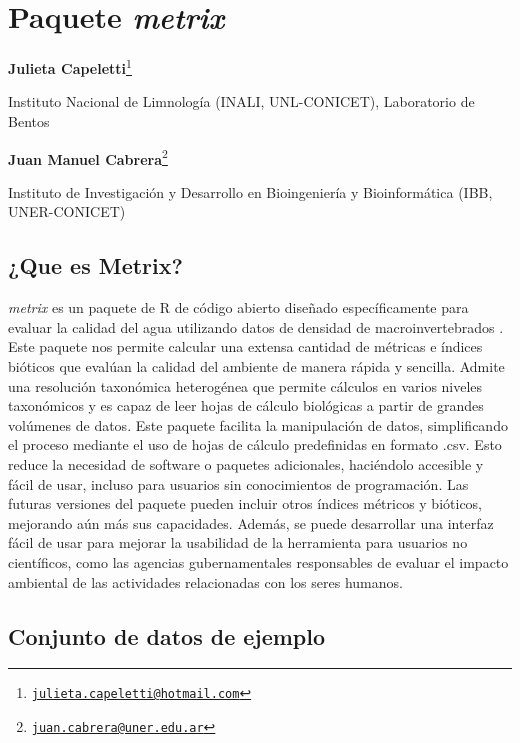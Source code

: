 \documentclass[
]{book}
\begin{document}
\hypertarget{metrix}{%
\chapter{\texorpdfstring{Paquete \emph{metrix}}{Paquete metrix}}\label{metrix}}

\textbf{Julieta Capeletti}\footnote{\href{mailto:julieta.capeletti@hotmail.com}{\nolinkurl{julieta.capeletti@hotmail.com}}}

Instituto Nacional de Limnología (INALI, UNL-CONICET), Laboratorio de Bentos

\textbf{Juan Manuel Cabrera}\footnote{\href{mailto:juan.cabrera@uner.edu.ar}{\nolinkurl{juan.cabrera@uner.edu.ar}}}

Instituto de Investigación y Desarrollo en Bioingeniería y Bioinformática (IBB, UNER-CONICET)

\hypertarget{que-es-metrix}{%
\section{¿Que es Metrix?}\label{que-es-metrix}}

\emph{metrix} es un paquete de R de código abierto diseñado específicamente para evaluar la calidad del agua utilizando datos de densidad de macroinvertebrados \citep{cabrera2023}.
Este paquete nos permite calcular una extensa cantidad de métricas e índices bióticos que evalúan la calidad del ambiente de manera rápida y sencilla.
Admite una resolución taxonómica heterogénea que permite cálculos en varios niveles taxonómicos y es capaz de leer hojas de cálculo biológicas a partir de grandes volúmenes de datos.
Este paquete facilita la manipulación de datos, simplificando el proceso mediante el uso de hojas de cálculo predefinidas en formato .csv.
Esto reduce la necesidad de software o paquetes adicionales, haciéndolo accesible y fácil de usar, incluso para usuarios sin conocimientos de programación.
Las futuras versiones del paquete pueden incluir otros índices métricos y bióticos, mejorando aún más sus capacidades.
Además, se puede desarrollar una interfaz fácil de usar para mejorar la usabilidad de la herramienta para usuarios no científicos, como las agencias gubernamentales responsables de evaluar el impacto ambiental de las actividades relacionadas con los seres humanos.

\hypertarget{conjunto-de-datos-de-ejemplo}{%
\section{Conjunto de datos de ejemplo}\label{conjunto-de-datos-de-ejemplo}}
\end{document}

